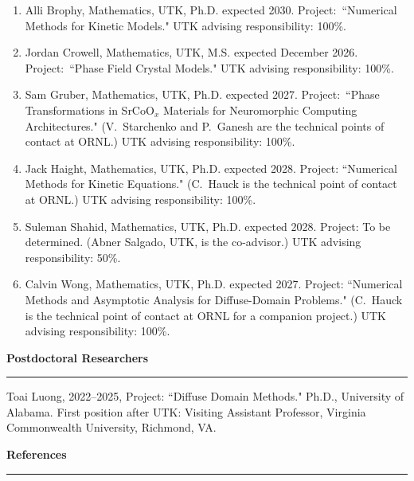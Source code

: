 \documentclass[10pt,letterpaper]{article}
\newcommand{\cvsection}[1]{%
  \Needspace{5\baselineskip}\par\vspace{13pt}%
  {\color{Smokey}\fontsize{15}{17}\selectfont\bfseries #1}\par\vspace{3pt}%
  {\color{UTOrange}\rule{\linewidth}{1.8pt}}\par\vspace{4pt}%
}
\newcommand{\cvsubsection}[1]{%
  \par\vspace{8pt}{\color{Smokey}\fontsize{12}{14}\selectfont\bfseries #1}\par\vspace{2pt}%
}
\begin{document}
	\begin{enumerate}[itemsep=2pt,topsep=3pt]
	\item
Alli Brophy, Mathematics, UTK, Ph.D. expected 2030. Project:~``Numerical Methods for Kinetic Models." UTK advising responsibility: 100\%.
	\item
Jordan Crowell, Mathematics, UTK, M.S. expected December 2026. Project:~``Phase Field Crystal Models." UTK advising responsibility: 100\%.
	\item
Sam Gruber, Mathematics, UTK, Ph.D. expected 2027. Project:~``Phase Transformations in SrCoO$_x$ Materials for Neuromorphic Computing Architectures." (V.~Starchenko and P.~Ganesh are the technical points of contact at ORNL.) UTK advising responsibility: 100\%.
	\item
Jack Haight, Mathematics, UTK, Ph.D. expected 2028. Project: ``Numerical Methods for Kinetic Equations." (C.~Hauck is the technical point of contact at ORNL.) UTK advising responsibility: 100\%.
	\item
Suleman Shahid, Mathematics, UTK, Ph.D. expected 2028. Project: To be determined. (Abner Salgado, UTK, is the co-advisor.) UTK advising responsibility: 50\%.
	\item
Calvin Wong, Mathematics, UTK, Ph.D. expected 2027. Project: ``Numerical Methods and Asymptotic Analysis for Diffuse-Domain Problems." (C.~Hauck is the technical point of contact at ORNL for a companion project.) UTK advising responsibility: 100\%.
	\end{enumerate}
	
\cvsection{Postdoctoral Researchers}
\cvsubsection{Former}
	\begin{description}
	\item
Toai Luong, 2022--2025, Project: ``Diffuse Domain Methods." Ph.D., University of Alabama. First position after UTK: Visiting Assistant Professor, Virginia Commonwealth University, Richmond, VA.
	\end{description}
	

\cvsection{References}
	
\end{document}

